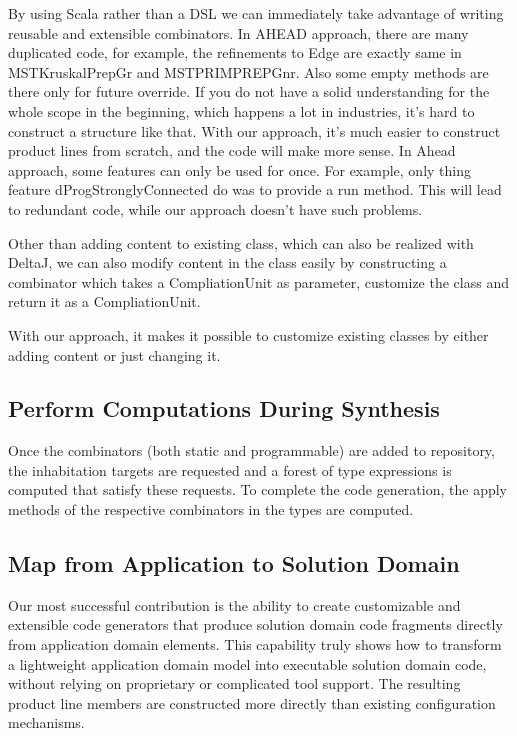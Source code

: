 By using Scala rather than a DSL we can immediately take advantage of writing reusable and extensible combinators.
In AHEAD approach, there are many duplicated code, for example, the refinements to Edge are exactly same in MSTKruskalPrepGr
 and MSTPRIMPREPGnr. Also some empty methods are there only for future override. If you do not have a solid understanding
  for the whole scope in the beginning, which happens a lot in industries, it's hard to construct a structure like that.
  With our approach, it's much easier to construct product lines from scratch, and the code will make more sense.
  In Ahead approach, some features can only be used for once. For example, only thing feature dProgStronglyConnected do
  was to provide a run method. This will lead to redundant code, while our approach doesn't have such problems.

 Other than adding content to existing class, which can also be realized with DeltaJ, we can also modify content in the
 class easily by constructing a combinator which takes a CompliationUnit as parameter, customize the class and return it
 as a CompliationUnit.

 With our approach, it makes it possible to customize existing classes by either adding content or just changing it.


 \subsection{Perform Computations During Synthesis}

Once the combinators (both static and programmable) are added to repository, the inhabitation targets are requested
and a forest of type expressions is computed that satisfy these requests. To complete the code generation, the apply
methods of the respective combinators in the types are computed.


 \subsection{Map from Application to Solution Domain}

 Our most successful contribution is the ability to create customizable and extensible code generators that produce
 solution domain code fragments directly from application domain elements.
 This capability truly shows how to transform a lightweight application domain model into executable solution domain
 code, without relying on proprietary or complicated tool support. The resulting product line members are constructed
 more directly than existing configuration mechanisms.

